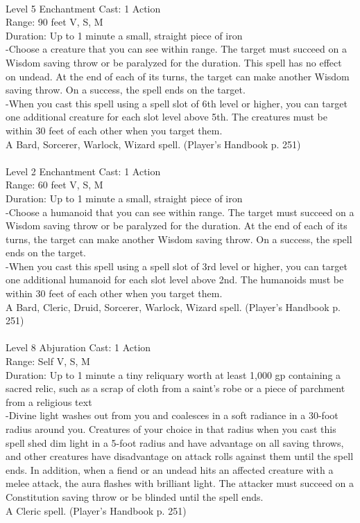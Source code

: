 \documentclass[10pt,twocolumn]{report}
\begin{document}
 \\
Level 5 \quad Enchantment \quad Cast: 1 Action\\
Range: 90 feet \quad V, S, M\\
Duration: Up to 1 minute \quad a small, straight piece of iron\\
-Choose a creature that you can see within range. The target must succeed on a Wisdom saving throw or be paralyzed for the duration. This spell has no effect on undead. At the end of each of its turns, the target can make another Wisdom saving throw. On a success, the spell ends on the target.\\
-When you cast this spell using a spell slot of 6th level or higher, you can target one additional creature for each slot level above 5th. The creatures must be within 30 feet of each other when you target them.\\
A Bard, Sorcerer, Warlock, Wizard spell. (Player's Handbook p. 251) \\


 \\
Level 2 \quad Enchantment \quad Cast: 1 Action\\
Range: 60 feet \quad V, S, M\\
Duration: Up to 1 minute \quad a small, straight piece of iron\\
-Choose a humanoid that you can see within range. The target must succeed on a Wisdom saving throw or be paralyzed for the duration. At the end of each of its turns, the target can make another Wisdom saving throw. On a success, the spell ends on the target.\\
-When you cast this spell using a spell slot of 3rd level or higher, you can target one additional humanoid for each slot level above 2nd. The humanoids must be within 30 feet of each other when you target them.\\
A Bard, Cleric, Druid, Sorcerer, Warlock, Wizard spell. (Player's Handbook p. 251) \\


 \\
Level 8 \quad Abjuration \quad Cast: 1 Action\\
Range: Self \quad V, S, M\\
Duration: Up to 1 minute \quad a tiny reliquary worth at least 1,000 gp containing a sacred relic, such as a scrap of cloth from a saint’s robe or a piece of parchment from a religious text\\
-Divine light washes out from you and coalesces in a soft radiance in a 30-foot radius around you.
Creatures of your choice in that radius when you cast this spell shed dim light in a 5-foot radius and have advantage on all saving throws, and other creatures have disadvantage on attack rolls against them until the spell ends. In addition, when a fiend or an undead hits an affected creature with a melee attack, the aura flashes with brilliant light. The attacker must succeed on a Constitution saving throw or be blinded until the spell ends.\\
A Cleric spell. (Player's Handbook p. 251) \\
\end{document}
